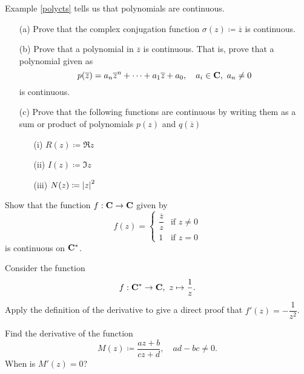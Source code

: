 \begin{problem}\label{prob 6.1}
Example \ref{polycts} tells us that polynomials are continuous. 
\begin{itemize}
\item[(a)] Prove that the complex conjugation function $\sigma(z) \coloneqq \overline{z}$ is continuous.
\item[(b)] Prove that a polynomial in $\overline{z}$ is continuous. That is, prove that a polynomial given as
\[p(\overline{z}) = a_n\overline{z}^n + \cdots + a_1\overline{z} + a_0,\quad a_i \in \mathbf C,\ a_n \neq 0\]
is continuous.
\item[(c)] Prove that the following functions are continuous by writing them as a sum or product of polynomials $p(z)$ and $q(\overline{z})$
\begin{itemize}
\item[(i)] $R(z) \coloneqq \Re z$
\item[(ii)] $I(z) \coloneqq \Im z$
\item[(iii)] $N(z) \coloneqq \left\lvert z\right\rvert^2$
\end{itemize}
\end{itemize}
\end{problem}

\vspace{0.1in}

\begin{problem}\label{prob 6.2}
Show that the function $f : \mathbf C \to \mathbf C$ given by
\[f(z) = \begin{cases} \dfrac{\overline{z}}{z} & \text{if }z \neq 0\\[1em] 1 & \text{if } z = 0 \end{cases}\]
is continuous on $\mathbf C^*$.
\end{problem}

\vspace{0.1in}

\begin{problem}\label{prob 6.3}
Consider the function \[f : \mathbf C^*\to \mathbf C,\ z \mapsto \frac{1}{z}.\]
Apply the definition of the derivative to give a direct proof that $f'(z) = -\dfrac{1}{z^2}$.
\end{problem}

\vspace{0.1in}

\begin{problem}\label{prob 6.4}
Find the derivative of the function 
\[M(z) \coloneqq \frac{az + b}{cz + d},\quad ad-bc \neq 0.\]
When is $M'(z) = 0$?
\end{problem}

